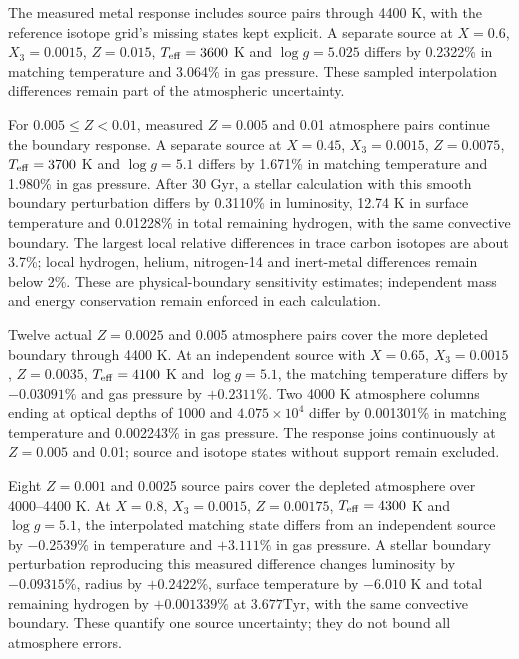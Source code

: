 \documentclass[11pt,letterpaper]{article}
\newcommand{\Tyr}{\mathrm{Tyr}}
\begin{document}
The measured metal response includes source pairs through 4400 K,
with the reference isotope grid's missing states kept explicit. A separate
source at $X=0.6$, $X_3=0.0015$, $Z=0.015$, $T_{\rm eff}=3600$ K and
$\log g=5.025$ differs by 0.2322\% in matching temperature and 3.064\% in
gas pressure. These sampled interpolation differences remain part of the
atmospheric uncertainty.

For $0.005\leq Z<0.01$, measured $Z=0.005$ and 0.01 atmosphere pairs
continue the boundary response. A separate source at $X=0.45$,
$X_3=0.0015$, $Z=0.0075$, $T_{\rm eff}=3700$ K and $\log g=5.1$
differs by 1.671\% in matching temperature and 1.980\% in gas pressure.
After 30 Gyr, a stellar calculation with this smooth boundary perturbation
differs by 0.3110\% in luminosity, 12.74 K in surface temperature and
0.01228\% in total remaining hydrogen, with the same convective boundary.
The largest local relative differences in trace carbon isotopes are about
3.7\%; local hydrogen, helium, nitrogen-14 and inert-metal differences
remain below 2\%. These are physical-boundary sensitivity estimates;
independent mass and energy conservation remain enforced in each calculation.

Twelve actual $Z=0.0025$ and 0.005 atmosphere pairs cover the more depleted
boundary through 4400 K. At an independent source with $X=0.65$,
$X_3=0.0015$, $Z=0.0035$, $T_{\rm eff}=4100$ K and $\log g=5.1$,
the matching temperature differs by $-0.03091\%$ and gas pressure by
$+0.2311\%$. Two 4000 K atmosphere columns ending at optical depths of
1000 and $4.075\times10^4$ differ by 0.001301\% in matching temperature
and 0.002243\% in gas pressure. The response joins continuously at
$Z=0.005$ and 0.01; source and isotope states without support remain excluded.

Eight $Z=0.001$ and 0.0025 source pairs cover the depleted
atmosphere over 4000--4400 K. At $X=0.8$, $X_3=0.0015$, $Z=0.00175$,
$T_{\rm eff}=4300$ K and $\log g=5.1$, the interpolated matching
state differs from an independent source by $-0.2539\%$ in temperature
and $+3.111\%$ in gas pressure. A stellar boundary perturbation reproducing
this measured difference changes luminosity by $-0.09315\%$, radius by
$+0.2422\%$, surface temperature by $-6.010$ K and total remaining hydrogen
by $+0.001339\%$ at $3.677\Tyr$, with the same convective boundary.
These quantify one source uncertainty; they do not bound all atmosphere errors.
\end{document}

